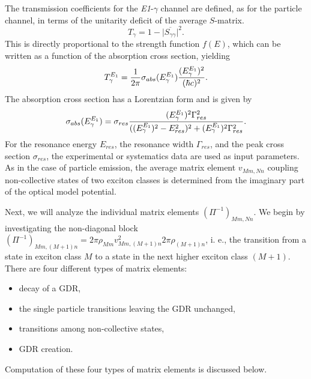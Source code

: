 The transmission coefficients for the \emph{E1}-$\gamma$ channel are
defined, as for the particle channel, in terms of the unitarity deficit of
the average $S$-matrix. 
\begin{equation}
T_{\gamma}=1-\Big|\overline{S_{\gamma\gamma}}\Big|^{2}.
\end{equation}
This is directly proportional to the strength function $f(E)$, which can be
written as a function of the absorption cross section, yielding 
\begin{equation}
T_{\gamma}^{E_{1}}=\frac{1}{2\pi}\sigma_{abs}(E_{\gamma}^{E_{1}})\frac{%
(E_{\gamma}^{E_{1}})^{2}}{(\hbar c)^{2}}.
\end{equation}
The absorption cross section has a Lorentzian form and is given by 
\begin{equation}
\sigma_{abs}(E_{\gamma}^{E_{1}})=\sigma_{res}\frac{(E_{\gamma}^{E_{1}})^{2}%
\Gamma_{res}^{2}}{((E_{\gamma}^{E_{1}})^{2}-E_{res}^{2})^{2}+(E_{%
\gamma}^{E_{1}})^{2}\Gamma_{res}^{2}}.
\end{equation}
For the resonance energy $E_{res}$, the resonance width $\Gamma_{res}$, and
the peak cross section $\sigma_{res}$, the experimental or systematics data
are used as input parameters. As in the case of particle emission, the
average matrix element $v_{Mm,Nn}$ coupling non-collective states of two
exciton classes is determined from the imaginary part of the optical model
potential.

Next, we will analyze the individual matrix elements $(\Pi^{-1})_{Mm,Nn}$.
We begin by investigating the non-diagonal block $(\Pi^{-1})_{Mm,(M+1)n}=2%
\pi\rho_{Mm}v_{Mm,(M+1)n}^{2}2\pi\rho_{(M+1)n}$, i. e., the transition from
a state in exciton class $M$ to a state in the next higher exciton class $%
(M+1)$. There are four different types of matrix elements:

\begin{itemize}
\item decay of a GDR,

\item the single particle transitions leaving the GDR unchanged,

\item transitions among non-collective states,

\item GDR creation.
\end{itemize}

Computation of these four types of matrix elements is discussed below.

